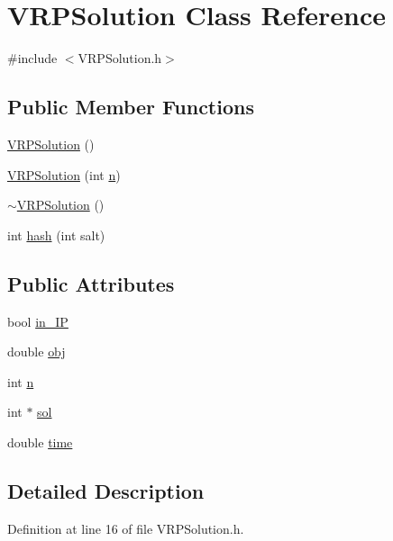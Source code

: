 \hypertarget{class_v_r_p_solution}{
\section{VRPSolution Class Reference}
\label{class_v_r_p_solution}
}


{\ttfamily \#include $<$VRPSolution.h$>$}

\subsection*{Public Member Functions}
\begin{DoxyCompactItemize}
\item 
\hyperlink{class_v_r_p_solution_af92ad6d17d3a11b1aa09b501628ad2bd}{VRPSolution} ()
\item 
\hyperlink{class_v_r_p_solution_a5b230f557251ae1cb72a37a6e6d8cc42}{VRPSolution} (int \hyperlink{class_v_r_p_solution_ae382a6737684c2589a4c196d6d405691}{n})
\item 
\hyperlink{class_v_r_p_solution_a23f939376cb0f3b7a0fbc149213d5328}{$\sim$VRPSolution} ()
\item 
int \hyperlink{class_v_r_p_solution_a7db9f2a4319008ebea6c3dcc8fab3d21}{hash} (int salt)
\end{DoxyCompactItemize}
\subsection*{Public Attributes}
\begin{DoxyCompactItemize}
\item 
bool \hyperlink{class_v_r_p_solution_a382d5191cd5fac7c0d8463ecfd42b486}{in\_\-IP}
\item 
double \hyperlink{class_v_r_p_solution_a1c007774a32dd2973cba3d2d52fccb90}{obj}
\item 
int \hyperlink{class_v_r_p_solution_ae382a6737684c2589a4c196d6d405691}{n}
\item 
int $\ast$ \hyperlink{class_v_r_p_solution_a1ef22fb6b5f13044ee9fc84e3fc5c2c2}{sol}
\item 
double \hyperlink{class_v_r_p_solution_ac6eba85ad901fbe6b53bd0e046adebf3}{time}
\end{DoxyCompactItemize}


\subsection{Detailed Description}


Definition at line 16 of file VRPSolution.h.



